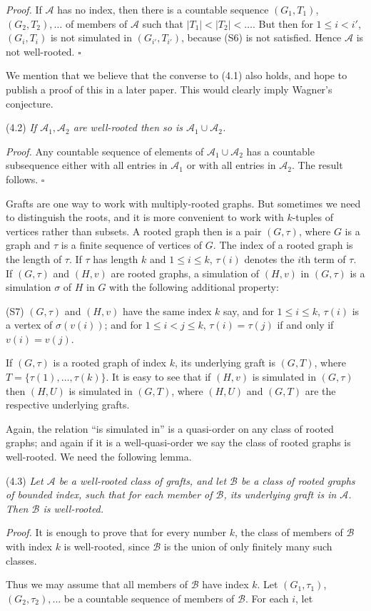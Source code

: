 \textit{Proof.} If $\mathscr{A}$ has no index, then there is a countable sequence $(G_1, T_1)$, $(G_2, T_2), \dots$ of members of $\mathscr{A}$ such that $|T_1| < |T_2| < \dots$. But then for $1 \le i < i'$, $(G_i, T_i)$ is not simulated in $(G_{i'}, T_{i'})$, because (S6) is not satisfied. Hence $\mathscr{A}$ is not well-rooted. $\square$

We mention that we believe that the converse to (4.1) also holds, and hope to publish a proof of this in a later paper. This would clearly imply Wagner's conjecture.

\stmt
(4.2) \textit{If $\mathscr{A}_1, \mathscr{A}_2$ are well-rooted then so is $\mathscr{A}_1 \cup \mathscr{A}_2$.}

\textit{Proof.} Any countable sequence of elements of $\mathscr{A}_1 \cup \mathscr{A}_2$ has a countable subsequence either with all entries in $\mathscr{A}_1$ or with all entries in $\mathscr{A}_2$. The result follows. $\square$

Grafts are one way to work with multiply-rooted graphs. But sometimes we need to distinguish the roots, and it is more convenient to work with $k$-tuples of vertices rather than subsets. A rooted graph then is a pair $(G, \tau)$, where $G$ is a graph and $\tau$ is a finite sequence of vertices of $G$. The index of a rooted graph is the length of $\tau$. If $\tau$ has length $k$ and $1 \le i \le k$, $\tau(i)$ denotes the $i$th term of $\tau$. If $(G, \tau)$ and $(H, v)$ are rooted graphs, a simulation of $(H, v)$ in $(G, \tau)$ is a simulation $\sigma$ of $H$ in $G$ with the following additional property:

\hspace*{12pt}(S7) $(G, \tau)$ and $(H, v)$ have the same index $k$ say, and for $1 \le i \le k$, $\tau(i)$ is a vertex of $\sigma(v(i))$; and for $1 \le i < j \le k$, $\tau(i) = \tau(j)$ if and only if $v(i) = v(j)$.

If $(G, \tau)$ is a rooted graph of index $k$, its underlying graft is $(G, T)$, where $T = \{\tau(1), \dots, \tau(k)\}$. It is easy to see that if $(H, v)$ is simulated in $(G, \tau)$ then $(H, U)$ is simulated in $(G, T)$, where $(H, U)$ and $(G, T)$ are the respective underlying grafts.

Again, the relation ``is simulated in'' is a quasi-order on any class of rooted graphs; and again if it is a well-quasi-order we say the class of rooted graphs is well-rooted. We need the following lemma.

\stmt
(4.3) \textit{Let $\mathscr{A}$ be a well-rooted class of grafts, and let $\mathscr{B}$ be a class of rooted graphs of bounded index, such that for each member of $\mathscr{B}$, its underlying graft is in $\mathscr{A}$. Then $\mathscr{B}$ is well-rooted.}

\textit{Proof.} It is enough to prove that for every number $k$, the class of members of $\mathscr{B}$ with index $k$ is well-rooted, since $\mathscr{B}$ is the union of only finitely many such classes.

Thus we may assume that all members of $\mathscr{B}$ have index $k$. Let $(G_1, \tau_1)$, $(G_2, \tau_2), \dots$ be a countable sequence of members of $\mathscr{B}$. For each $i$, let
